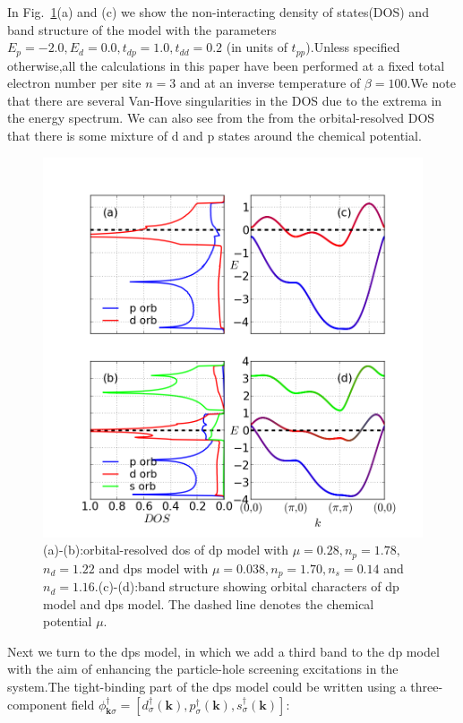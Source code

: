 \documentclass[10pt]{ruthesis}
\begin{document}
{In Fig.~\ref{fig1}(a) and (c) we show the non-interacting density of states(DOS) and band structure of the model with the parameters $E_p=-2.0,E_d=0.0,t_{dp}=1.0,t_{dd}=0.2$ (in units of $t_{pp}$).Unless specified otherwise,all the calculations in this paper have been performed at a fixed  total electron number per site $n=3$ and at an inverse temperature of $\beta=100$.We note that there are several Van-Hove singularities in the DOS due to the extrema in the energy spectrum. We can also see from the from the orbital-resolved DOS that there is some mixture of d and p states around the chemical potential.
\begin{figure}[h]
 \includegraphics[width=\columnwidth]{./plotForpublishing/pd+dps_band_struc}
 \caption{\label{fig1}(a)-(b):orbital-resolved dos of dp model with $\mu=0.28,n_p=1.78,$  $n_d=1.22$ and dps model with $\mu=0.038,n_p=1.70,n_s=0.14$ and $n_d=1.16$.(c)-(d):band structure showing orbital characters of dp model and dps model. The dashed line denotes the chemical potential $\mu$.}
\end{figure}

Next we turn to the dps model, in which we add a third band to the dp model with the aim of enhancing the particle-hole screening excitations in the system.The tight-binding part of the dps model could be written  using a three-component field  $\phi^\dagger_{\mathbf k\sigma}=[d^\dagger_\sigma(\mathbf k),p^\dagger_\sigma(\mathbf k),s^\dagger_\sigma(\mathbf k)]$:
 
}
\end{document}
